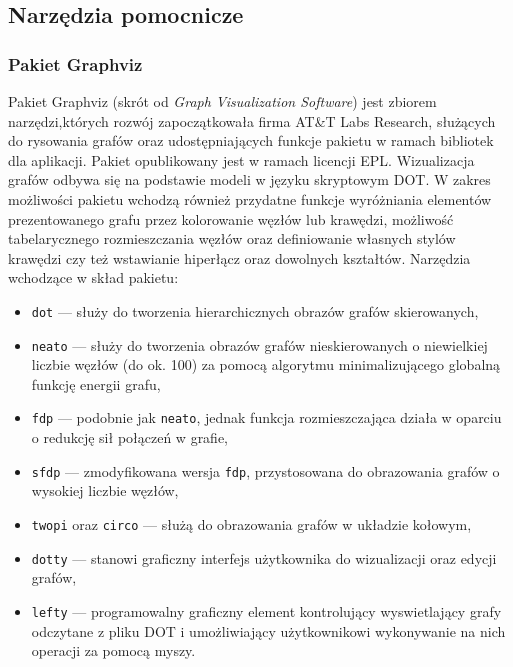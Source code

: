 \subsection{Narzędzia pomocnicze}\label{ss_internals_misc}
\subsubsection{\textbf{Pakiet Graphviz}}
\label{sss_internals_misc_graphviz}
\par{
  Pakiet Graphviz (skrót od \emph{Graph Visualization Software}) jest zbiorem narzędzi,których rozwój zapoczątkowała firma AT\&T Labs Research, służących do rysowania grafów oraz udostępniających funkcje pakietu w ramach bibliotek dla aplikacji.
  Pakiet opublikowany jest w ramach licencji EPL.
  Wizualizacja grafów odbywa się na podstawie modeli w języku skryptowym DOT.
  W zakres możliwości pakietu wchodzą również przydatne funkcje wyróżniania elementów prezentowanego grafu przez kolorowanie węzłów lub krawędzi, możliwość tabelarycznego rozmieszczania węzłów oraz definiowanie własnych stylów krawędzi czy też wstawianie hiperłącz oraz dowolnych kształtów.
  Narzędzia wchodzące w skład pakietu:
  \begin{itemize}
    \item \texttt{dot} --- służy do tworzenia hierarchicznych obrazów grafów skierowanych,
    \item \texttt{neato} --- służy do tworzenia obrazów grafów nieskierowanych o niewielkiej liczbie węzłów (do ok. 100) za pomocą algorytmu minimalizującego globalną funkcję energii grafu,
    \item \texttt{fdp} --- podobnie jak \texttt{neato}, jednak funkcja rozmieszczająca działa w oparciu o redukcję sił połączeń w grafie,
    \item \texttt{sfdp} --- zmodyfikowana wersja \texttt{fdp}, przystosowana do obrazowania grafów o wysokiej liczbie węzłów,
    \item \texttt{twopi} oraz \texttt{circo} --- służą do obrazowania grafów w układzie kołowym,
    \item \texttt{dotty} --- stanowi graficzny interfejs użytkownika do wizualizacji oraz edycji grafów,
    \item \texttt{lefty} --- programowalny graficzny element kontrolujący wyswietlający grafy odczytane z pliku DOT i umożliwiający użytkownikowi wykonywanie na nich operacji za pomocą myszy.
  \end{itemize}
}
